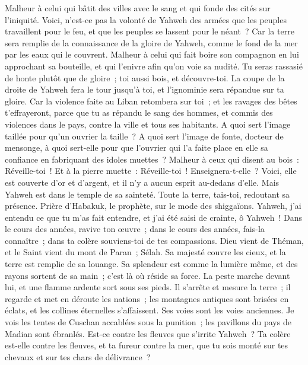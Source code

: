 \begin{multicols}{2}
Malheur à celui qui bâtit des villes avec le sang et qui fonde des cités sur l'iniquité.
Voici, n'est-ce pas la volonté de Yahweh des armées que les peuples travaillent pour le feu, et que les peuples se lassent pour le néant~?
Car la terre sera remplie de la connaissance de la gloire de Yahweh, comme le fond de la mer par les eaux qui le couvrent.
Malheur à celui qui fait boire son compagnon en lui approchant sa bouteille, et qui l'enivre afin qu'on voie sa nudité.
Tu seras rassasié de honte plutôt que de gloire~; toi aussi bois, et découvre-toi. La coupe de la droite de Yahweh fera le tour jusqu'à toi, et l'ignominie sera répandue sur ta gloire.
Car la violence faite au Liban retombera sur toi~; et les ravages des bêtes t'effrayeront, parce que tu as répandu le sang des hommes, et commis des violences dans le pays, contre la ville et tous ses habitants.
A quoi sert l'image taillée pour qu'un ouvrier la taille~? A quoi sert l'image de fonte, docteur de mensonge, à quoi sert-elle pour que l'ouvrier qui l'a faite place en elle sa confiance en fabriquant des idoles muettes~?
Malheur à ceux qui disent au bois~: Réveille-toi~! Et à la pierre muette~: Réveille-toi~! Enseignera-t-elle~? Voici, elle est couverte d'or et d'argent, et il n'y a aucun esprit au-dedans d'elle.
Mais Yahweh est dans le temple de sa sainteté. Toute la terre, tais-toi, redoutant sa présence.
\VerseOne{}Prière d'Habakuk, le prophète, sur le mode des shiggaïons.
Yahweh, j'ai entendu ce que tu m'as fait entendre, et j'ai été saisi de crainte, ô Yahweh~! Dans le cours des années, ravive ton œuvre~; dans le cours des années, fais-la connaître~; dans ta colère souviens-toi de tes compassions.
Dieu vient de Théman, et le Saint vient du mont de Paran~; Sélah. Sa majesté couvre les cieux, et la terre est remplie de sa louange.
Sa splendeur est comme la lumière même, et des rayons sortent de sa main~; c'est là où réside sa force.
La peste marche devant lui, et une flamme ardente sort sous ses pieds.
Il s'arrête et mesure la terre~; il regarde et met en déroute les nations~; les montagnes antiques sont brisées en éclats, et les collines éternelles s'affaissent. Ses voies sont les voies anciennes.
Je vois les tentes de Cuschan accablées sous la punition~; les pavillons du pays de Madian sont ébranlés.
Est-ce contre les fleuves que s'irrite Yahweh~? Ta colère est-elle contre les fleuves, et ta fureur contre la mer, que tu sois monté sur tes chevaux et sur tes chars de délivrance~?

\end{multicols}
